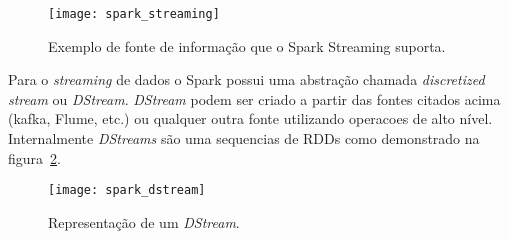 \begin{figure}[!h]
	\caption{\label{fig:sparkstreaming} Exemplo de fonte de informação que o Spark Streaming suporta.}
	\begin{center}
		\texttt{[image: spark\_streaming]}
	\end{center}
\end{figure}

Para o \textit{streaming} de dados o Spark possui uma abstração chamada \textit{discretized stream} ou \textit{DStream}. \textit{DStream} podem ser criado a partir das fontes citados acima (kafka, Flume, etc.) ou qualquer outra fonte utilizando operacoes de alto nível. Internalmente \textit{DStreams} são uma sequencias de RDDs como demonstrado na figura~\ref{fig:sparkdstream}.

\begin{figure}[!h]
	\caption{\label{fig:sparkdstream} Representação de um \textit{DStream}.}
	\begin{center}
		\texttt{[image: spark\_dstream]}
	\end{center}
\end{figure}
